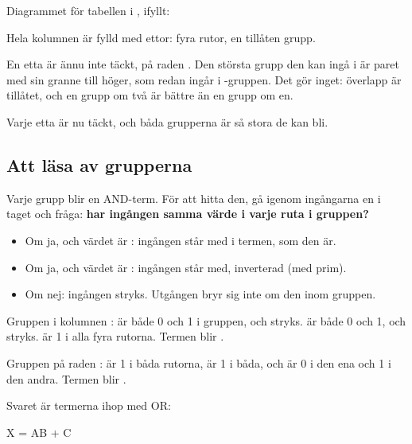 Diagrammet för tabellen i , ifyllt:


\noindent Hela kolumnen  är fylld med ettor: fyra rutor, en tillåten grupp.


\noindent En etta är ännu inte täckt, på raden . Den största grupp den kan ingå i är
paret med sin granne till höger, som redan ingår i -gruppen. Det gör inget: överlapp är
tillåtet, och en grupp om två är bättre än en grupp om en.


\noindent Varje etta är nu täckt, och båda grupperna är så stora de kan bli.

\subsection{Att läsa av grupperna}
\label{c4:a4}
Varje grupp blir en AND-term. För att hitta den, gå igenom ingångarna en i taget och fråga:
\textbf{har ingången samma värde i varje ruta i gruppen?}
\begin{itemize}
  \item Om ja, och värdet är : ingången står med i termen, som den är.
  \item Om ja, och värdet är : ingången står med, inverterad (med prim).
  \item Om nej: ingången stryks. Utgången bryr sig inte om den inom gruppen.
\end{itemize}

Gruppen i kolumnen :  är både 0 och 1 i gruppen, och stryks.  är både 0
och 1, och stryks.  är 1 i alla fyra rutorna. Termen blir \textbf{}.

Gruppen på raden :  är 1 i båda rutorna,  är 1 i båda, och 
är 0 i den ena och 1 i den andra. Termen blir \textbf{}.

Svaret är termerna ihop med OR:

\begin{console}
X = AB + C
\end{console}

